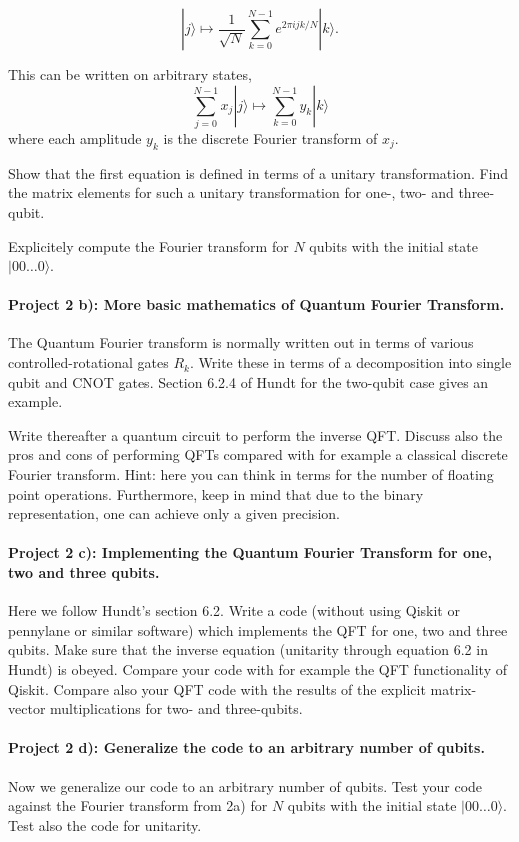 \documentclass[%
oneside,                 %
final,                   %
10pt]{article}
\begin{document}
\[
|j\rangle \mapsto \frac{1}{\sqrt{N}} \sum_{k=0}^{N-1} e^{2\pi ijk/N}|k\rangle.
\]

This can be written on arbitrary states,
\[
\sum_{j=0}^{N-1}x_j|j\rangle \mapsto \sum_{k=0}^{N-1} y_k|k\rangle
\]
where each amplitude \(y_k\) is the discrete Fourier transform of
\(x_j\).

Show that the first equation is defined in terms of a unitary
transformation. Find the matrix elements for such a unitary
transformation for one-, two- and three-qubit.

Explicitely compute the Fourier transform for $N$ qubits with the initial state $\vert 00\dots 0\rangle$.

\paragraph{Project 2 b): More basic mathematics of  Quantum Fourier Transform.}
The Quantum Fourier transform is normally written out in terms of
various controlled-rotational gates $R_k$. Write these in terms of a
decomposition into single qubit and CNOT gates.  Section 6.2.4 of Hundt for the two-qubit case gives an example.

Write thereafter a quantum circuit to perform the inverse QFT.
Discuss also the pros and cons of performing QFTs compared with for example a classical discrete Fourier transform. Hint: here you can think in terms for the number of floating point operations. Furthermore, keep in mind that due to the binary representation, one can achieve only a given precision. 

\paragraph{Project 2 c): Implementing the Quantum Fourier Transform for one, two and three qubits.}
Here we follow Hundt's section 6.2. Write a code (without using Qiskit or pennylane or similar software) which implements the QFT
for one, two and three qubits. Make sure that the inverse equation (unitarity through equation 6.2 in Hundt) is obeyed. 
Compare your code with for example the QFT functionality of Qiskit.  Compare also your QFT code with the results of the explicit matrix-vector multiplications for two- and three-qubits.

\paragraph{Project 2 d): Generalize the code to an arbitrary number of qubits.}
Now we generalize our code to an arbitrary number of qubits. Test your
code against the Fourier transform from 2a) for $N$ qubits with the
initial state $\vert 00\dots 0\rangle$. Test also the code for unitarity.
\end{document}
